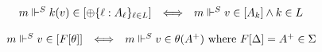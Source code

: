 \documentclass[10pt,a4paper]{amsart}
\begin{document}
 
  
\par  \quad  \[\begin{array}[]{lcl}m\Vdash^{S}k(v)\in[{\oplus}\{\ell:A_{\ell}\}_{\ell\in L}]&\Longleftrightarrow&m\Vdash^{S}v\in[A_{k}]\land k\in L\end{array}\]\quad  \quad  
  
 
  
\par  \quad  \[\begin{array}[]{lcl}m\Vdash^{S}v\in[F[\theta]]&\Longleftrightarrow&m\Vdash^{S}v\in\theta(A^{+})\ \mbox{where $F[\Delta]=A^{+}\in\Sigma$}\end{array}\]\quad  \quad  
  
 
 
\par
 
 
\end{document}
